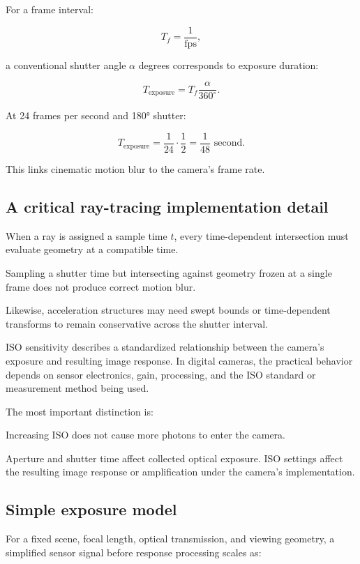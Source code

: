 For a frame interval:

\[ T_f=\frac1{\mathrm{fps}}, \]

a conventional shutter angle \(\alpha\) degrees corresponds to exposure duration:

\[ \boxed{ T_{\mathrm{exposure}} = T_f\frac{\alpha}{360^\circ}. } \]

At 24 frames per second and 180° shutter:

\[ T_{\mathrm{exposure}} = \frac1{24}\cdot\frac12 = \boxed{\frac1{48}\text{ second}}. \]

This links cinematic motion blur to the camera's frame rate.

\subsection{A critical ray-tracing implementation detail}\label{02-foundations-ii-ch036-a-critical-ray-tracing-implementation-detail}

When a ray is assigned a sample time \(t\), every time-dependent intersection must evaluate geometry at a compatible time.

Sampling a shutter time but intersecting against geometry frozen at a single frame does not produce correct motion blur.

Likewise, acceleration structures may need swept bounds or time-dependent transforms to remain conservative across the shutter interval.

ISO sensitivity describes a standardized relationship between the camera's exposure and resulting image response. In digital cameras, the practical behavior depends on sensor electronics, gain, processing, and the ISO standard or measurement method being used.

The most important distinction is:

Increasing ISO does not cause more photons to enter the camera.

Aperture and shutter time affect collected optical exposure. ISO settings affect the resulting image response or amplification under the camera's implementation.

\subsection{Simple exposure model}\label{02-foundations-ii-ch036-simple-exposure-model}

For a fixed scene, focal length, optical transmission, and viewing geometry, a simplified sensor signal before response processing scales as:

